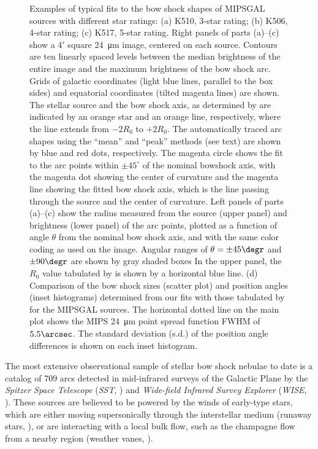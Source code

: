 \begin{figure}
  \caption[]{Examples of typical fits to the bow shock shapes of
    MIPSGAL sources with different star ratings: (a) K510, 3-star
    rating; (b) K506, 4-star rating; (c) K517, 5-star rating.  Right
    panels of parts (a)--(c) show a 4\('\) square \SI{24}{\um} image,
    centered on each source.  Contours are ten linearly spaced levels
    between the median brightness of the entire image and the maximum
    brightness of the bow shock arc. Grids of galactic coordinates
    (light blue lines, parallel to the box sides) and equatorial
    coordinates (tilted magenta lines) are shown.  The stellar source
    and the bow shock axis, as determined by \citet{Kobulnicky:2016a}
    are indicated by an orange star and an orange line, respectively,
    where the line extends from \(-2 R_0\) to \(+2 R_0\).  The
    automatically traced arc shapes using the ``mean'' and ``peak''
    methods (see text) are shown by blue and red dots, respectively.
    The magenta circle shows the fit to the arc points within
    \(\pm 45^\circ\) of the nominal bowshock axis, with the magenta dot
    showing the center of curvature and the magenta line showing the
    fitted bow shock axis, which is the line passing through the
    source and the center of curvature.  Left panels of parts (a)--(c)
    show the radius measured from the source (upper panel) and
    brightness (lower panel) of the arc points, plotted as a function
    of angle \(\theta\) from the nominal bow shock axis, and with the same
    color coding as used on the image. Angular ranges of
    \(\theta = \pm 45\degr\) and \(\pm 90\degr\) are shown by gray shaded
    boxes In the upper panel, the \(R_0\) value tabulated by
    \citet{Kobulnicky:2016a} is shown by a horizontal blue line. (d)
    Comparison of the bow shock sizes (scatter plot) and position
    angles (inset histograms) determined from our fits with those
    tabulated by \citet{Kobulnicky:2016a} for the MIPSGAL sources.
    The horizontal dotted line on the main plot shows the MIPS
    \SI{24}{\um} point spread function FWHM of \(5.5\arcsec\).  The
    standard deviation (s.d.) of the position angle differences is
    shown on each inset histogram.}
  \label{fig:mipsgal-examples}
\end{figure}


The most extensive observational sample of stellar bow shock nebulae
to date is a catalog of 709 arcs \citep{Kobulnicky:2016a} detected in
mid-infrared surveys of the Galactic Plane by the \textit{Spitzer
  Space Telescope} (\textit{SST}, \citealp{Werner:2004a}) and
\textit{Wide-field Infrared Survey Explorer} (\textit{WISE},
\citealp{Wright:2010a}).  These sources are believed to be powered by
the winds of early-type stars, which are either moving supersonically
through the interstellar medium (runaway stars,
\citealp{Gvaramadze:2008a}), or are interacting with a local bulk
flow, such as the champagne flow from a nearby \hii{} region (weather
vanes, \citealp{Povich:2008a}).


